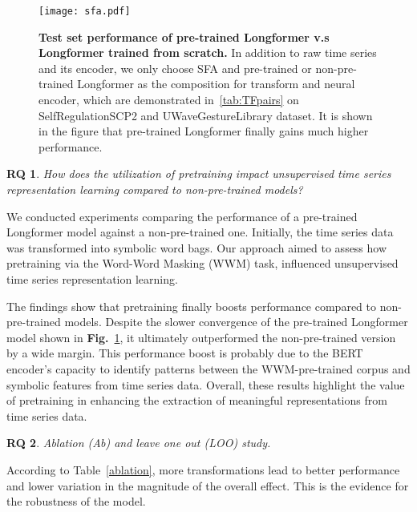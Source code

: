 \documentclass{article}
\newtheorem{researchq}{RQ}
\begin{document}
\begin{figure}
    \centering
    \texttt{[image: sfa.pdf]}\label{img:sfa}
    \caption{\textbf{Test set performance of pre-trained Longformer v.s Longformer trained from scratch.} In addition to raw time series and its encoder, we only choose SFA and pre-trained or non-pre-trained Longformer as the composition for transform and neural encoder, which are demonstrated in~\ref{tab:TFpairs} on SelfRegulationSCP2 and UWaveGestureLibrary dataset. It is shown in the figure that pre-trained Longformer finally gains much higher performance.}
    \label{fig:sfa}
\end{figure}

\begin{researchq}
How does the utilization of pretraining impact unsupervised time series representation learning compared to non-pre-trained models?
\end{researchq}

We conducted experiments comparing the performance of a pre-trained Longformer model against a non-pre-trained one. Initially, the time series data was transformed into symbolic word bags. Our approach aimed to assess how pretraining via the Word-Word Masking (WWM) task, influenced unsupervised time series representation learning.

The findings show that pretraining finally boosts performance compared to non-pre-trained models. Despite the slower convergence of the pre-trained Longformer model shown in \textbf{Fig.}~\ref{fig:sfa}, it ultimately outperformed the non-pre-trained version by a wide margin. This performance boost is probably due to the BERT encoder's capacity to identify patterns between the WWM-pre-trained corpus and symbolic features from time series data. Overall, these results highlight the value of pretraining in enhancing the extraction of meaningful representations from time series data.


\begin{researchq}
    Ablation (Ab) and leave one out (LOO) study.
\end{researchq}
According to Table~\ref{ablation}, more transformations lead to better performance and lower variation in the magnitude of the overall effect. This is the evidence for the robustness of the model.
\end{document}
